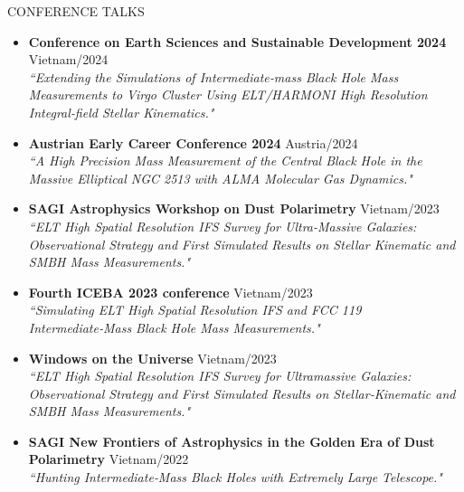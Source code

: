 \documentclass{resume} %
\begin{document}
\begin{rSection}{CONFERENCE TALKS} 
\begin{itemize}
    \item \textbf{Conference on Earth Sciences and Sustainable Development 2024} \hfill Vietnam/2024 \\
    \textit{\small ``Extending the Simulations of Intermediate‑mass Black Hole Mass Measurements to Virgo Cluster Using ELT/HARMONI High Resolution Integral‑field Stellar Kinematics."} 
    
    \item \textbf{Austrian Early Career Conference 2024} \hfill Austria/2024\\
    \textit{``A High Precision Mass Measurement of the Central Black Hole in the Massive Elliptical NGC 2513 with ALMA Molecular Gas Dynamics."} 

    \item \textbf{SAGI Astrophysics Workshop on Dust Polarimetry} \hfill Vietnam/2023 \\
    \textit{``ELT High Spatial Resolution IFS Survey for Ultra-Massive Galaxies: Observational Strategy and First Simulated Results on Stellar Kinematic and SMBH Mass Measurements."}
    \item \textbf{Fourth ICEBA 2023 conference }\hfill Vietnam/2023 \\
    \textit{``Simulating ELT High Spatial Resolution IFS and FCC 119 Intermediate‑Mass Black Hole Mass Measurements."}

    \item \textbf{Windows on the Universe }\hfill Vietnam/2023 \\
    \textit{``ELT High Spatial Resolution IFS Survey for Ultramassive Galaxies: Observational Strategy and First Simulated Results on Stellar‑Kinematic and SMBH Mass Measurements."}

    \item \textbf{SAGI New Frontiers of Astrophysics in the Golden Era of Dust Polarimetry} \hfill  Vietnam/2022 \\
    \textit{``Hunting Intermediate‑Mass Black Holes with Extremely Large Telescope."}

\end{itemize}


\end{rSection}
\end{document}
